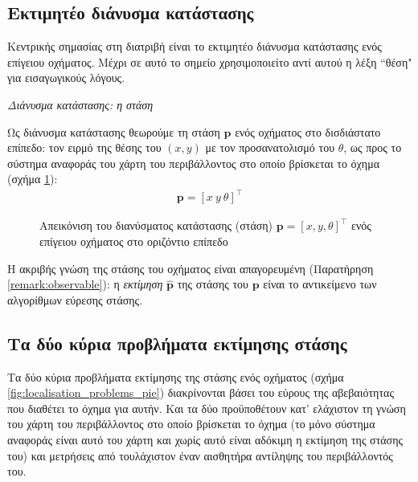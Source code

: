 \subsection{Εκτιμητέο διάνυσμα κατάστασης}
\label{subsection:01_01_02:01}

Κεντρικής σημασίας στη διατριβή είναι το εκτιμητέο διάνυσμα κατάστασης ενός
επίγειου οχήματος. Μέχρι σε αυτό το σημείο χρησιμοποιείτο αντί αυτού η λέξη
``θέση" για εισαγωγικούς λόγους.

\begin{bw_box}
\begin{definition}
  \textit{Διάνυσμα κατάστασης: η στάση}

Ως διάνυσμα κατάστασης θεωρούμε τη στάση $\bm{p}$ ενός οχήματος στο δισδιάστατο
επίπεδο: τον ειρμό της θέσης του $(x,y)$ με τον προσανατολισμό του $\theta$,
ως προς το σύστημα αναφοράς του χάρτη του περιβάλλοντος στο οποίο βρίσκεται
το όχημα (σχήμα \ref{fig:pose_figure}):
  \begin{align}
    \bm{p} = [x \ y \ \theta]^\top
\end{align}

\end{definition}
\end{bw_box}

\begin{figure}[htbp]\centering
  
  \caption{\small Απεικόνιση του διανύσματος κατάστασης (στάση) $\bm{p} = [x,y,\theta]^\top$
           ενός επίγειου οχήματος στο οριζόντιο επίπεδο}
  \label{fig:pose_figure}
\end{figure}

Η ακριβής γνώση της στάσης του οχήματος είναι απαγορευμένη (Παρατήρηση
\ref{remark:observable}): η \textit{εκτίμηση} $\hat{\bm{p}}$ της στάσης του
$\bm{p}$ είναι το αντικείμενο των αλγορίθμων εύρεσης στάσης.



\subsection{Τα δύο κύρια προβλήματα εκτίμησης στάσης}
\label{subsec:01_01_02_2}

Τα δύο κύρια προβλήματα εκτίμησης της στάσης ενός οχήματος (σχήμα
\ref{fig:localisation_problems_pie}) διακρίνονται βάσει του εύρους της
αβεβαιότητας που διαθέτει το όχημα για αυτήν. Και τα δύο προϋποθέτουν
κατ' ελάχιστον τη γνώση του χάρτη του περιβάλλοντος στο οποίο
βρίσκεται το όχημα (το μόνο σύστημα αναφοράς είναι αυτό του χάρτη και χωρίς
αυτό είναι αδόκιμη η εκτίμηση της στάσης του) και μετρήσεις από τουλάχιστον
έναν αισθητήρα αντίληψης του περιβάλλοντός του.

